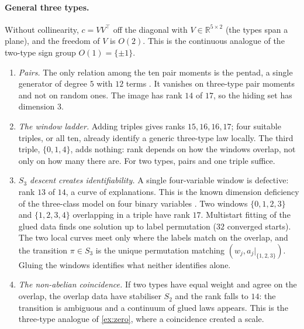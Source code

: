 \documentclass[11pt]{article}
\theoremstyle{definition}\newtheorem{definition}[theorem]{Definition}\newtheorem{remark}[theorem]{Remark}\newtheorem{example}[theorem]{Example}
\newcommand{\R}{\mathbb R}
\begin{document}
\paragraph{General three types.} Without collinearity, $c=VV^\top$ off the diagonal with $V\in\R^{5\times2}$ (the types span a
plane), and the freedom of $V$ is $O(2)$. This is the continuous analogue of the two-type sign group $O(1)=\{\pm1\}$.

\begin{proposition}\label{prop:three}
\begin{enumerate}
\item[(1)] \emph{Pairs.} The only relation among the ten pair moments is the pentad, a single generator of degree $5$ with $12$ terms
  \cite{DrtonSturmfelsSullivant2007}. It vanishes on three-type pair moments and not on random ones. The image has rank $14$ of $17$, so the
  hiding set has dimension $3$.
\item[(2)] \emph{The window ladder.} Adding triples gives ranks $15,16,16,17$; four suitable triples, or all ten, already identify a
  generic three-type law locally. The third triple, $\{0,1,4\}$, adds nothing: rank depends on how the windows overlap, not only on how many
  there are. For two types, pairs and one triple suffice.
\item[(3)] \emph{$S_3$ descent creates identifiability.} A single four-variable window is defective: rank $13$ of $14$, a curve of
  explanations. This is the known dimension deficiency of the three-class model on four binary variables \cite{GeigerHeckermanKingMeek2001}.
  Two windows $\{0,1,2,3\}$ and $\{1,2,3,4\}$ overlapping in a triple have rank $17$. Multistart fitting of the glued data finds one
  solution up to label permutation ($32$ converged starts). The two local curves meet only where the labels match on the overlap, and the
  transition $\pi\in S_3$ is the unique permutation matching $(w_j,a_j|_{\{1,2,3\}})$. Gluing the windows identifies what neither identifies
  alone.
\item[(4)] \emph{The non-abelian coincidence.} If two types have equal weight and agree on the overlap, the overlap data have stabiliser
  $S_2$ and the rank falls to $14$: the transition is ambiguous and a continuum of glued laws appears. This is the three-type analogue of
  \cref{ex:zero}, where a coincidence created a scale.
\end{enumerate}
\end{proposition}
\end{document}

